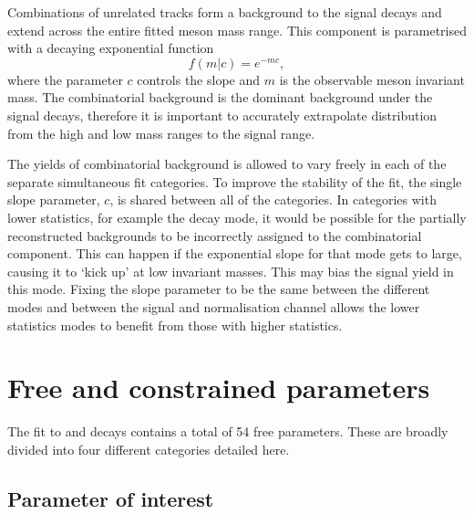 Combinations of unrelated tracks form a background to the signal decays and extend across the entire fitted \Bp meson mass range. 
This component is parametrised with a decaying exponential function 
\begin{equation}
f(m|c) = e^{-mc},
\end{equation}
where the parameter $c$ controls the slope and $m$ is the observable \Bp meson invariant mass. 
The combinatorial background is the dominant background under the signal decays, therefore it is important to accurately extrapolate distribution from the high and low mass ranges to the signal range. 

The yields of combinatorial background is allowed to vary freely in each of the separate simultaneous fit categories. To improve the stability of the fit, the single slope parameter, $c$, is shared between all of the categories. In categories with lower statistics, for example the \decay{\Dsp}{\Kp\pim\pip} decay mode, it would be possible for the partially reconstructed backgrounds to be incorrectly assigned to the combinatorial component. This can happen if the exponential slope for that mode gets to large, causing it to `kick up' at low invariant masses. This may bias the signal yield in this mode. Fixing the slope parameter to be the same between the different \Dsp modes and between the signal and normalisation channel allows the lower statistics modes to benefit from those with higher statistics.

\section{Free and constrained parameters}

The fit to \decay{\Bp}{\Dsp\phiz} and \decay{\Bp}{\Dsp\Dzb} decays contains a total of 54 free parameters. 
These are broadly divided into four different categories detailed here.


\subsection{Parameter of interest}

